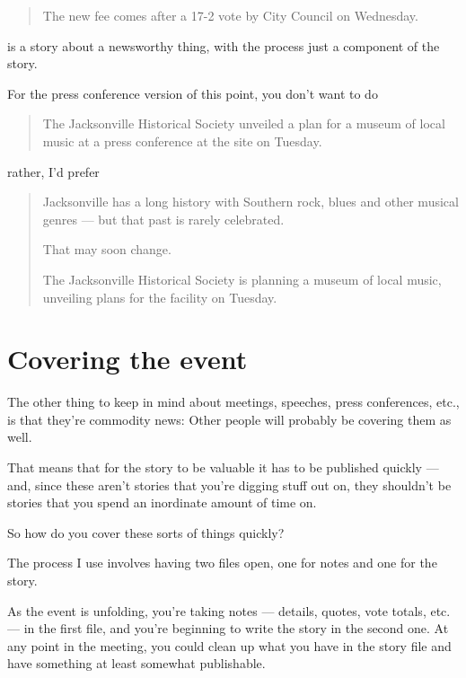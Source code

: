 \documentclass[
  11pt,
  american,
  letterpaperpaper,
  extrafontsizes,onecolumn,openright
  ]{memoir}
\begin{document}
\begin{quote}
The new fee comes after a 17-2 vote by City Council on Wednesday.
\end{quote}

is a story about a newsworthy thing, with the process just a component of the story.

For the press conference version of this point, you don't want to do

\begin{quote}
The Jacksonville Historical Society unveiled a plan for a museum of local music at a press conference at the site on Tuesday.
\end{quote}

rather, I'd prefer

\begin{quote}
Jacksonville has a long history with Southern rock, blues and other musical genres --- but that past is rarely celebrated.

That may soon change.

The Jacksonville Historical Society is planning a museum of local music, unveiling plans for the facility on Tuesday.
\end{quote}

\hypertarget{covering-the-event}{%
\section*{Covering the event}\label{covering-the-event}}

The other thing to keep in mind about meetings, speeches, press conferences, etc., is that they're commodity news: Other people will probably be covering them as well.

That means that for the story to be valuable it has to be published quickly --- and, since these aren't stories that you're digging stuff out on, they shouldn't be stories that you spend an inordinate amount of time on.

So how do you cover these sorts of things quickly?

The process I use involves having two files open, one for notes and one for the story.

As the event is unfolding, you're taking notes --- details, quotes, vote totals, etc. --- in the first file, and you're beginning to write the story in the second one. At any point in the meeting, you could clean up what you have in the story file and have something at least somewhat publishable.
\end{document}

